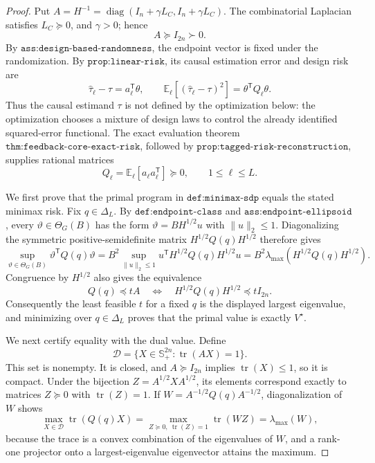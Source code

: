 \documentclass{article}
\begin{document}
\begin{proof}
Put \(A=H^{-1}=\operatorname{diag}(I_n+\gamma L_C,I_n+\gamma L_C)\).  The combinatorial Laplacian satisfies \(L_C\succeq0\), and \(\gamma>0\); hence
\[
 A\succeq I_{2n}\succ0.
\]
By \(\texttt{ass:design-based-randomness}\), the endpoint vector is fixed under the randomization.  By \(\texttt{prop:linear-risk}\), its causal estimation error and design risk are
\[
 \widehat\tau_\ell-\tau=a_\ell^{\mathsf T}\theta,
 \qquad
 \mathbb E_\ell[(\widehat\tau_\ell-\tau)^2]
 =\theta^{\mathsf T}Q_\ell\theta.
\]
Thus the causal estimand \(\tau\) is not defined by the optimization below: the optimization chooses a mixture of design laws to control the already identified squared-error functional.  The exact evaluation theorem \(\texttt{thm:feedback-core-exact-risk}\), followed by \(\texttt{prop:tagged-risk-reconstruction}\), supplies rational matrices
\[
 Q_\ell=\mathbb E_\ell[a_\ell a_\ell^{\mathsf T}]\succeq0,
 \qquad 1\le\ell\le L.
\]

We first prove that the primal program in \(\texttt{def:minimax-sdp}\) equals the stated minimax risk.  Fix \(q\in\Delta_L\).  By \(\texttt{def:endpoint-class}\) and \(\texttt{ass:endpoint-ellipsoid}\), every \(\vartheta\in\Theta_G(B)\) has the form \(\vartheta=BH^{1/2}u\) with \(\|u\|_2\le1\).  Diagonalizing the symmetric positive-semidefinite matrix \(H^{1/2}Q(q)H^{1/2}\) therefore gives
\[
 \sup_{\vartheta\in\Theta_G(B)}
 \vartheta^{\mathsf T}Q(q)\vartheta
 =B^2\sup_{\|u\|_2\le1}u^{\mathsf T}H^{1/2}Q(q)H^{1/2}u
 =B^2\lambda_{\max}\!\left(H^{1/2}Q(q)H^{1/2}\right).
\]
Congruence by \(H^{1/2}\) also gives the equivalence
\[
 Q(q)\preceq tA
 \quad\Longleftrightarrow\quad
 H^{1/2}Q(q)H^{1/2}\preceq tI_{2n}.
\]
Consequently the least feasible \(t\) for a fixed \(q\) is the displayed largest eigenvalue, and minimizing over \(q\in\Delta_L\) proves that the primal value is exactly \(V^\star\).

We next certify equality with the dual value.  Define
\[
 \mathcal D=\{X\in\mathbb S_+^{2n}:\operatorname{tr}(AX)=1\}.
\]
This set is nonempty.  It is closed, and \(A\succeq I_{2n}\) implies \(\operatorname{tr}(X)\le1\), so it is compact.  Under the bijection \(Z=A^{1/2}XA^{1/2}\), its elements correspond exactly to matrices \(Z\succeq0\) with \(\operatorname{tr}(Z)=1\).  If \(W=A^{-1/2}Q(q)A^{-1/2}\), diagonalization of \(W\) shows
\[
 \max_{X\in\mathcal D}\operatorname{tr}(Q(q)X)
 =\max_{Z\succeq0,\ \operatorname{tr}(Z)=1}\operatorname{tr}(WZ)
 =\lambda_{\max}(W),
\]
because the trace is a convex combination of the eigenvalues of \(W\), and a rank-one projector onto a largest-eigenvalue eigenvector attains the maximum.


\end{proof}
\end{document}
